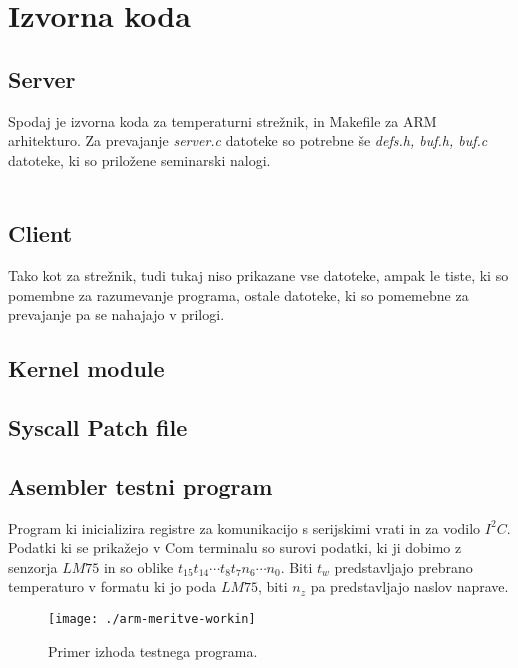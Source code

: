 \documentclass[10pt,a4paper]{article}
\begin{document}
\newpage
\section{Izvorna koda}
\subsection{Server}
Spodaj je izvorna koda za temperaturni strežnik, in Makefile za ARM arhitekturo. Za prevajanje \emph{server.c} datoteke so potrebne še \emph{defs.h, buf.h, buf.c} datoteke, ki so priložene seminarski nalogi.\\
\ \\



\subsection{Client}
Tako kot za strežnik, tudi tukaj niso prikazane vse datoteke, ampak le tiste, ki so pomembne za razumevanje programa, ostale datoteke, ki so pomemebne za prevajanje pa se nahajajo v prilogi.
%



\subsection{Kernel module}



\subsection{Syscall Patch file}


\pagebreak
\subsection{Asembler testni program}
Program ki inicializira registre za komunikacijo s serijskimi vrati in za vodilo $I^2C$. Podatki ki se prikažejo v Com terminalu so surovi podatki, ki ji dobimo z senzorja $LM75$ in so oblike $t_{15}t_{14}\cdots t_8 t_7 n_6 \cdots n_0$. Biti $t_w$ predstavljajo prebrano temperaturo v formatu ki jo poda $LM75$, biti $n_z$ pa predstavljajo naslov naprave.\\
\begin{figure}[hbtp]
  \centering
  \texttt{[image: ./arm-meritve-workin]}
  \caption{Primer izhoda testnega programa.}
  \label{fig:arm-meritve-workin}
\end{figure}


\end{document}
